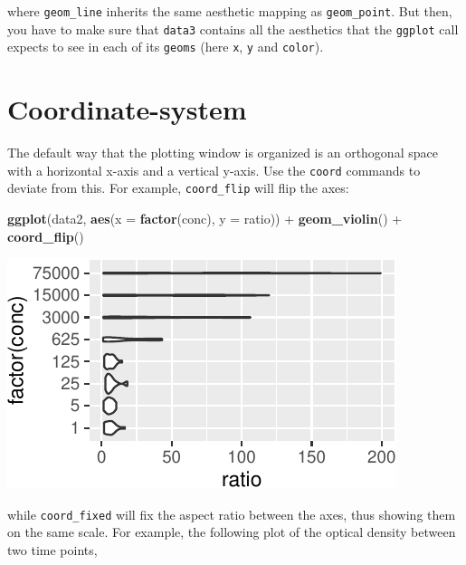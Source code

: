 \documentclass[]{book}
\newenvironment{Shaded}{}{}
\newcommand{\DataTypeTok}[1]{\textcolor[rgb]{0.56,0.13,0.00}{#1}}
\newcommand{\KeywordTok}[1]{\textcolor[rgb]{0.00,0.44,0.13}{\textbf{#1}}}
\newcommand{\NormalTok}[1]{#1}
\newcommand{\OperatorTok}[1]{\textcolor[rgb]{0.40,0.40,0.40}{#1}}
\newcommand{\StringTok}[1]{\textcolor[rgb]{0.25,0.44,0.63}{#1}}
\begin{document}
where \texttt{geom\_line} inherits the same aesthetic mapping as \texttt{geom\_point}. But then, you have to make sure that \texttt{data3} contains all the aesthetics that the \texttt{ggplot} call expects to see in each of its \texttt{geoms} (here \texttt{x}, \texttt{y} and \texttt{color}).

\hypertarget{coordinate-system}{%
\section{Coordinate-system}\label{coordinate-system}}

The default way that the plotting window is organized is an orthogonal space with a horizontal x-axis and a vertical y-axis. Use the \texttt{coord} commands to deviate from this. For example, \texttt{coord\_flip} will flip the axes:

\begin{Shaded}
\begin{Highlighting}[]
\KeywordTok{ggplot}\NormalTok{(data2, }\KeywordTok{aes}\NormalTok{(}\DataTypeTok{x =} \KeywordTok{factor}\NormalTok{(conc), }\DataTypeTok{y =}\NormalTok{ ratio)) }\OperatorTok{+}
\StringTok{  }\KeywordTok{geom_violin}\NormalTok{() }\OperatorTok{+}
\StringTok{  }\KeywordTok{coord_flip}\NormalTok{()}
\end{Highlighting}
\end{Shaded}

\begin{center}\includegraphics[width=\textwidth]{TRES-Tidy-Tutorial_files/figure-latex/unnamed-chunk-128-1} \end{center}

while \texttt{coord\_fixed} will fix the aspect ratio between the axes, thus showing them on the same scale. For example, the following plot of the optical density between two time points,
\end{document}
